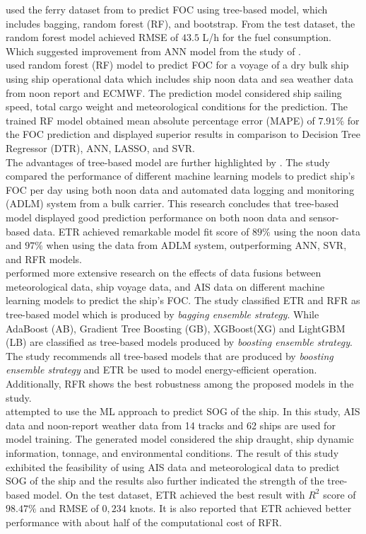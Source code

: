  used the ferry dataset from  to predict FOC using tree-based model, which includes bagging, random forest (RF), and bootstrap. From the test dataset, the random forest model achieved RMSE of $43.5$ L/h for the fuel consumption. Which suggested improvement from ANN model from the study of .\\ 

 used random forest (RF) model to predict FOC for a voyage of a dry bulk ship using ship operational data which includes ship noon data and sea weather data from noon report and ECMWF. The prediction model considered ship sailing speed, total cargo weight and meteorological conditions for the prediction. The trained RF model obtained mean absolute percentage error (MAPE) of $7.91\%$ for the FOC prediction and displayed superior results in comparison to Decision Tree Regressor (DTR), ANN, LASSO, and SVR.\\      

The advantages of tree-based model are further highlighted by . The study compared the performance of different machine learning models to predict ship's FOC per day using both noon data and automated data logging and monitoring (ADLM) system from a bulk carrier. This research concludes that tree-based model displayed good prediction performance on both noon data and sensor-based data. ETR achieved remarkable model fit score of $89\%$ using the noon data and $97\%$ when using the data from ADLM system, outperforming ANN, SVR, and RFR models.\\

 performed more extensive research on the effects of data fusions between meteorological data, ship voyage data, and AIS data on different machine learning models to predict the ship's FOC. The study classified ETR and RFR as tree-based model which is produced by \emph{bagging ensemble strategy}. While AdaBoost (AB), Gradient Tree Boosting (GB), XGBoost(XG) and LightGBM (LB) are classified as tree-based models produced by \emph{boosting ensemble strategy}. The study recommends all tree-based models that are produced by \emph{boosting ensemble strategy} and ETR be used to model energy-efficient operation. Additionally, RFR shows the best robustness among the proposed models in the study.\\

 attempted to use the ML approach to predict SOG of the ship. In this study, AIS data and noon-report weather data from 14 tracks and 62 ships are used for model training. The generated model considered the ship draught, ship dynamic information, tonnage, and environmental conditions. The result of this study exhibited the feasibility of using AIS data and meteorological data to predict SOG of the ship and the results also further indicated the strength of the tree-based model. On the test dataset, ETR achieved the best result with $R^2$ score of $98.47\%$ and RMSE of $0,234$ knots. It is also reported that ETR achieved better performance with about half of the computational cost of RFR.\\ 

